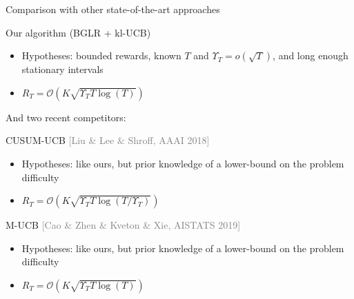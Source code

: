 \documentclass[11pt,english,ignorenonframetext,]{beamer}
\begin{document}
\begin{frame}{Comparison with other state-of-the-art approaches}

  \begin{block}{Our algorithm (BGLR + kl-UCB)}
    \begin{itemize}
      \item Hypotheses: bounded rewards, known $T$ and $\Upsilon_T = o(\sqrt{T})$, and long enough stationary intervals
      \item $R_T = \mathcal{O}(K \sqrt{\Upsilon_T T \log(T)})$
    \end{itemize}
  \end{block}

  And two recent competitors:


  \begin{block}{CUSUM-UCB \hfill{} \textcolor{gray}{[Liu \& Lee \& Shroff, AAAI 2018]}}
    \begin{itemize}
      \item Hypotheses: like ours, \alert{but prior knowledge of a lower-bound on the problem difficulty}
      \item $R_T = \mathcal{O}(K \sqrt{\Upsilon_T T \log(T / \Upsilon_T)})$
    \end{itemize}
  \end{block}

  \begin{block}{M-UCB \hfill{} \textcolor{gray}{[Cao \& Zhen \& Kveton \& Xie, AISTATS 2019]}}
    \begin{itemize}
      \item Hypotheses: like ours, \alert{but prior knowledge of a lower-bound on the problem difficulty}
      \item $R_T = \mathcal{O}(K \sqrt{\Upsilon_T T \log(T)})$
    \end{itemize}
  \end{block}

\end{frame}
\end{document}

